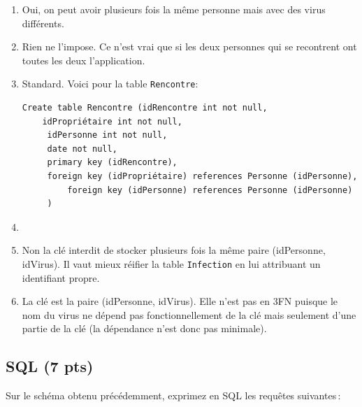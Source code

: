   
\begin{solution}
 \begin{enumerate}
    \item Oui, on peut avoir plusieurs fois la même
       personne mais avec des virus différents.
     \item Rien ne l'impose. Ce n'est vrai que si  
        les deux personnes qui se recontrent ont toutes
        les deux l'application.
     \item Standard. Voici pour la table \texttt{Rencontre}:
     
\begin{verbatim}
Create table Rencontre (idRencontre int not null, 
    idPropriétaire int not null, 
     idPersonne int not null, 
     date not null,
     primary key (idRencontre),
     foreign key (idPropriétaire) references Personne (idPersonne),
         foreign key (idPersonne) references Personne (idPersonne)
     )
\end{verbatim}
     
     \item 
     
     \item Non la clé interdit de stocker plusieurs
       fois la même paire (idPersonne, idVirus).
       Il vaut mieux réifier la table \texttt{Infection}
       en lui attribuant un identifiant propre.
     \item La clé est la paire (idPersonne, idVirus).
     Elle n'est pas en 3FN puisque le nom du virus
     ne dépend pas fonctionnellement de la clé 
     mais seulement d'une partie de la clé (la dépendance
     n'est donc pas minimale).
 \end{enumerate}
 
\end{solution}


\subsection*{SQL (7 pts)}

Sur le schéma obtenu précédemment, exprimez en SQL les requêtes suivantes\,:

